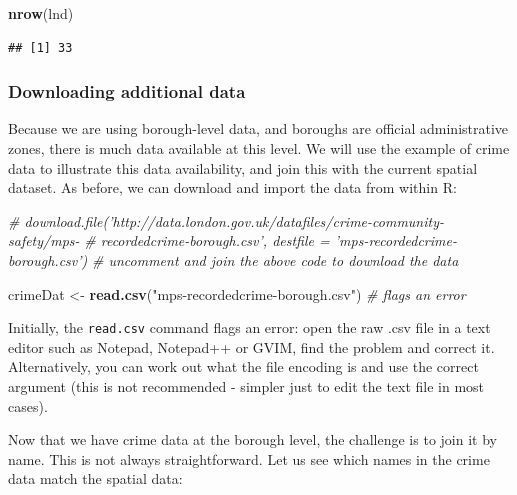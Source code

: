 \documentclass[]{article}
\newenvironment{Shaded}{}{}
\newcommand{\KeywordTok}[1]{\textcolor[rgb]{0.00,0.44,0.13}{\textbf{{#1}}}}
\newcommand{\DataTypeTok}[1]{\textcolor[rgb]{0.56,0.13,0.00}{{#1}}}
\newcommand{\DecValTok}[1]{\textcolor[rgb]{0.25,0.63,0.44}{{#1}}}
\newcommand{\StringTok}[1]{\textcolor[rgb]{0.25,0.44,0.63}{{#1}}}
\newcommand{\CommentTok}[1]{\textcolor[rgb]{0.38,0.63,0.69}{\textit{{#1}}}}
\newcommand{\NormalTok}[1]{{#1}}
\begin{document}
\begin{Shaded}
\begin{Highlighting}[]
\KeywordTok{nrow}\NormalTok{(lnd)}
\end{Highlighting}
\end{Shaded}
\begin{verbatim}
## [1] 33
\end{verbatim}
\subsubsection{Downloading additional data}

Because we are using borough-level data, and boroughs are official
administrative zones, there is much data available at this level. We
will use the example of crime data to illustrate this data availability,
and join this with the current spatial dataset. As before, we can
download and import the data from within R:

\begin{Shaded}
\begin{Highlighting}[]
\CommentTok{# download.file('http://data.london.gov.uk/datafiles/crime-community-safety/mps-}
\CommentTok{# recordedcrime-borough.csv', destfile = 'mps-recordedcrime-borough.csv')}
\CommentTok{# uncomment and join the above code to download the data}

\NormalTok{crimeDat <- }\KeywordTok{read.csv}\NormalTok{(}\StringTok{"mps-recordedcrime-borough.csv"}\NormalTok{)  }\CommentTok{# flags an error}
\end{Highlighting}
\end{Shaded}
Initially, the \texttt{read.csv} command flags an error: open the raw
.csv file in a text editor such as Notepad, Notepad++ or GVIM, find the
problem and correct it. Alternatively, you can work out what the file
encoding is and use the correct argument (this is not recommended -
simpler just to edit the text file in most cases).

\begin{Shaded}
\end{Shaded}
Now that we have crime data at the borough level, the challenge is to
join it by name. This is not always straightforward. Let us see which
names in the crime data match the spatial data:
\end{document}

